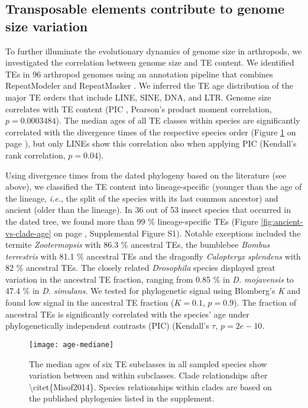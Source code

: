 \subsection{Transposable elements contribute to genome size
variation}

To further illuminate the evolutionary dynamics of genome size in
arthropods, we investigated the correlation between genome size and TE
content. We identified TEs in 96 arthropod genomes using an annotation
pipeline that combines RepeatModeler \citep{Smit2015} and RepeatMasker
\citep{Smit2015a}. We inferred the TE age distribution of the major TE
orders that include LINE, SINE, DNA, and LTR. Genome size correlates
with TE content (PIC \citep{Felsenstein1985}, Pearson's product moment
correlation, $p = 0.0003484$). The median ages of all TE classes
within species are significantly correlated with the divergence times of
the respective species order (Figure \ref{fig:median-ages} on page
\pageref{fig:median-ages}), but only LINEs show this
correlation also when applying PIC (Kendall's rank correlation,
$p = 0.04$).

Using divergence times from the dated phylogeny based on the literature
(see above), we classified the TE content into lineage-specific (younger
than the age of the lineage, \emph{i.e.}, the split of the species with
its last common ancestor) and ancient (older than the lineage). In 36
out of 53 insect species that occurred in the dated tree, we found more
than 99 \% lineage-specific TEs (Figure \ref{fig:ancient-vs-clade-age} on page
\pageref{fig:ancient-vs-clade-age}, Supplemental Figure S1).
Notable exceptions included the termite \emph{Zootermopsis} with 86.3 \%
ancestral TEs, the bumblebee \emph{Bombus terrestris} with 81.1 \%
ancestral TEs and the dragonfly \emph{Calopteryx splendens} with 82 \%
ancestral TEs. The closely related \emph{Drosophila} species displayed
great variation in the ancestral TE fraction, ranging from 0.85 \% in
\emph{D. mojavensis} to 47.4 \% in \emph{D. simulans}. We tested for
phylogenetic signal using Blomberg's \emph{K} and found low signal in
the ancestral TE fraction ($K = 0.1$, $p = 0.9$). The
fraction of ancestral TEs is significantly correlated with the species'
age under phylogenetically independent contrasts (PIC) (Kendall's
$\tau$, $p = 2e-10$.

\begin{figure}[h!]
\begin{center}
\texttt{[image: age-mediane]}
\caption[Median ages of TE subclasses in arthropod genomes]{{The median ages of six TE subclasses in all sampled species show
variation between and within subclasses. Clade relationships after
\textbackslash{}citet\{Misof2014\}. Species relationships within clades
are based on the published phylogenies listed in the supplement.
{\label{fig:median-ages}}%
}}
\end{center}
\end{figure}

